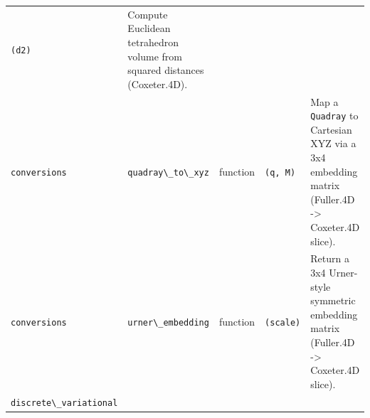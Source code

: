 \documentclass[
  10pt,
]{article}
\newcommand{\passthrough}[1]{#1}
\begin{document}
\begin{longtable}[]{@{}lllll@{}}
\begin{minipage}[t]{0.17\columnwidth}
\passthrough{\lstinline!(d2)!}\strut
\end{minipage} & \begin{minipage}[t]{0.17\columnwidth}\raggedright
Compute Euclidean tetrahedron volume from squared distances
(Coxeter.4D).\strut
\end{minipage}\tabularnewline
\begin{minipage}[t]{0.17\columnwidth}\raggedright
\passthrough{\lstinline!conversions!}\strut
\end{minipage} & \begin{minipage}[t]{0.17\columnwidth}\raggedright
\passthrough{\lstinline!quadray\_to\_xyz!}\strut
\end{minipage} & \begin{minipage}[t]{0.17\columnwidth}\raggedright
function\strut
\end{minipage} & \begin{minipage}[t]{0.17\columnwidth}\raggedright
\passthrough{\lstinline!(q, M)!}\strut
\end{minipage} & \begin{minipage}[t]{0.17\columnwidth}\raggedright
Map a \passthrough{\lstinline!Quadray!} to Cartesian XYZ via a 3x4
embedding matrix (Fuller.4D -\textgreater{} Coxeter.4D slice).\strut
\end{minipage}\tabularnewline
\begin{minipage}[t]{0.17\columnwidth}\raggedright
\passthrough{\lstinline!conversions!}\strut
\end{minipage} & \begin{minipage}[t]{0.17\columnwidth}\raggedright
\passthrough{\lstinline!urner\_embedding!}\strut
\end{minipage} & \begin{minipage}[t]{0.17\columnwidth}\raggedright
function\strut
\end{minipage} & \begin{minipage}[t]{0.17\columnwidth}\raggedright
\passthrough{\lstinline!(scale)!}\strut
\end{minipage} & \begin{minipage}[t]{0.17\columnwidth}\raggedright
Return a 3x4 Urner-style symmetric embedding matrix (Fuller.4D
-\textgreater{} Coxeter.4D slice).\strut
\end{minipage}\tabularnewline
\begin{minipage}[t]{0.17\columnwidth}\raggedright
\passthrough{\lstinline!discrete\_variational!}\strut
\end{minipage} & \begin{minipage}[t]{0.17\columnwidth}\raggedright

\end{minipage}
\end{longtable}
\end{document}
